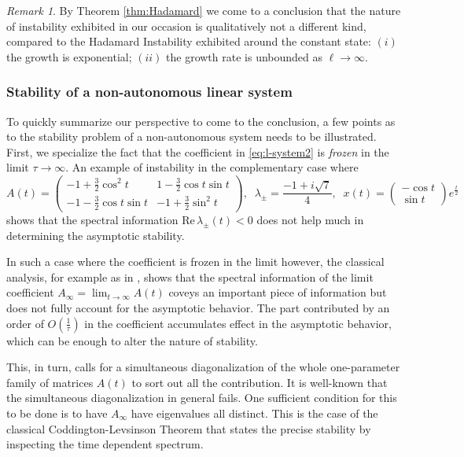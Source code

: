 \documentclass[a4paper,11pt]{article}
\theoremstyle{remark}
\newtheorem{remark}{Remark}[section]
\begin{document}
\begin{remark} By Theorem \ref{thm:Hadamard} we come to a conclusion that the nature of instability exhibited in our occasion is qualitatively not a different kind, compared to the Hadamard Instability exhibited around the constant state: $(i)$ the growth is exponential; $(ii)$ the growth rate is unbounded as $\ell \rightarrow \infty$.
\end{remark}

\subsubsection{Stability of a non-autonomous linear system}
To quickly summarize our perspective to come to the conclusion, a few points as to the stability problem of a non-autonomous system needs to be illustrated. First, we specialize the fact that the coefficient in \eqref{eq:l-system2} is {\it frozen} in the limit $\tau \rightarrow \infty$. An example of instability in the complementary case where
$$ 
A(t) = \left(\begin{array}{cc} -1 + \frac{3}{2}\cos^2 t & 1-\frac{3}{2}\cos t \sin t \\ -1 -\frac{3}{2}\cos t \sin t & -1 + \frac{3}{2}\sin^2 t \end{array}\right), \;\; \lambda_\pm = \frac{-1 + i\sqrt{7}}{4}, 
\; \; x(t) = \left(\begin{array}{c} -\cos t\\ \sin t \end{array}\right) e^{\tfrac{t}{2}}$$
shows that the spectral information  $\textrm{Re}\, \lambda_\pm(t)<0$ does not help much in determining the asymptotic stability.

In such a case where the coefficient is frozen in the limit however, the classical analysis, for example as in \cite{CL55}, shows that the spectral information of the limit coefficient $\displaystyle A_\infty=\lim_{t \rightarrow\infty} A(t)$ coveys an important piece of information but does not fully account for the asymptotic behavior. The part contributed by an order of $O(\tfrac{1}{\tau})$ in the coefficient accumulates effect in the asymptotic behavior, which can be enough to alter the nature of stability.

This, in turn, calls for a simultaneous diagonalization of the whole one-parameter family of matrices $A(t)$ to sort out all the contribution. It is well-known that the simultaneous diagonalization in general fails. One sufficient condition for this to be done is to have $A_\infty$ have eigenvalues all distinct. This is the case of the classical Coddington-Levsinson Theorem \cite{CL55} that states the precise stability by inspecting the time dependent spectrum.
\end{document}
